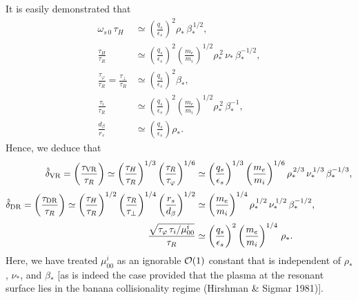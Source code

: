 \documentclass[notitlepage,12pt]{article}
\begin{document}
It is easily demonstrated that
\begin{align}
\omega_{s\,0}\,\tau_H&\simeq \left(\frac{q_s}{\epsilon_s}\right)^2\rho_\ast\,\beta_\ast^{\,1/2},\\[0.5ex]
\frac{\tau_H}{\tau_R}&\simeq \left(\frac{q_s}{\epsilon_s}\right)^2\left(\frac{m_e}{m_i}\right)^{1/2}\rho_\ast^{\,2}\,\nu_\ast\,\beta_\ast^{-1/2},\\[0.5ex]
\frac{\tau_\varphi}{\tau_R} = \frac{\tau_\perp}{\tau_R} &\simeq \left(\frac{q_s}{\epsilon_s}\right)^2\beta_\ast,\\[0.5ex]
\frac{\tau_i}{\tau_R} &\simeq  \left(\frac{q_s}{\epsilon_s}\right)^2\left(\frac{m_e}{m_i}\right)^{1/2}\rho_\ast^{\,2}\,\beta_\ast^{-1},\\[0.5ex]
\frac{d_\beta}{r_s} &\simeq \left(\frac{q_s}{\epsilon_s}\right)\rho_\ast.
\end{align} 
Hence, we deduce that 
\begin{align}
\hat{\delta}_{\rm VR} = \left(\frac{\tau_{\rm VR}}{\tau_R}\right) \simeq\left(\frac{\tau_H}{\tau_R}\right)^{1/3}\left(\frac{\tau_R}{\tau_\varphi}\right)^{1/6}&\simeq \left(\frac{q_s}{\epsilon_s}\right)^{1/3}\left(\frac{m_e}{m_i}\right)^{1/6}\rho_\ast^{\,2/3}\,\nu_\ast^{\,1/3}\,\beta_\ast^{-1/3},\\[0.5ex]
\hat{\delta}_{\rm DR} = \left(\frac{\tau_{\rm DR}}{\tau_R}\right) \simeq \left(\frac{\tau_H}{\tau_R}\right)^{1/2}\left(\frac{\tau_R}{\tau_\perp}\right)^{1/4}\left(\frac{r_s}{d_\beta}\right)^{1/2}&\simeq \left(\frac{m_e}{m_i}\right)^{1/4}\rho_\ast^{\,1/2}\,\nu_\ast^{\,1/2}\,\beta_\ast^{-1/2},\\[0.5ex]
\frac{\sqrt{\tau_\varphi\, \tau_i/\mu_{00}^i}}{\tau_R}&\simeq \left(\frac{q_s}{\epsilon_s}\right)^2\left(\frac{m_e}{m_i}\right)^{1/4}\,\rho_\ast.
\end{align}
Here, we have treated $\mu_{00}^i$ as an ignorable ${\cal O}(1)$ constant that is independent of $\rho_\ast$, $\nu_\ast$, and
$\beta_\ast$ [as is indeed the case provided that the plasma at the resonant surface lies in the banana collisionality regime (Hirshman \& Sigmar 1981)]. 
\end{document}
